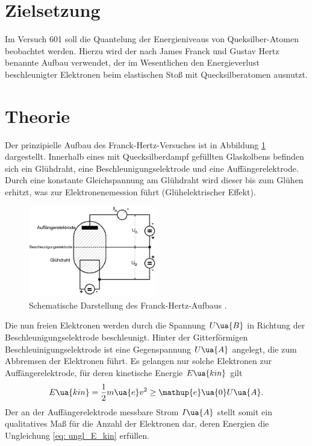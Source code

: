 \setcounter{page}{1}
\section*{Zielsetzung}
Im Versuch 601 soll die Quantelung der Energieniveaus von Queksilber-Atomen beobachtet werden.
Hierzu wird der nach James Franck und Gustav Hertz benannte Aufbau verwendet, der im Wesentlichen
den Energieverlust beschleunigter Elektronen beim elastischen Stoß mit Quecksilberatomen ausnutzt.

\section{Theorie}
Der prinzipielle Aufbau des Franck-Hertz-Versuches ist in Abbildung \ref{fig: schema_aufbau} dargestellt. Innerhalb
eines mit Quecksilberdampf gefüllten Glaskolbens befinden sich ein Glühdraht, eine Beschleunigungselektrode und
eine Auffängerelektrode. Durch eine konstante Gleichspannung am Glühdraht wird dieser bis zum Glühen
erhitzt, was zur Elektronenemession führt (Glühelektrischer Effekt).
\begin{figure}
  \centering
  \includegraphics[width = 0.5\textwidth]{pics/schema_aufbau.png}
  \caption{Schematische Darstellung des Franck-Hertz-Aufbaus \cite{anleitung601}.}
  \label{fig: schema_aufbau}
\end{figure}
Die nun freien Elektronen werden durch die Spannung $U\ua{B}$ in Richtung der Beschleunigungselektrode
beschleunigt. Hinter der Gitterförmigen Beschleuinigungselektrode ist eine Gegenspannung $U\ua{A}$ angelegt, die zum Abbremsen
der Elektronen führt. Es gelangen nur solche Elektronen zur Auffängerelektrode, für deren kinetische Energie $E\ua{kin}$
gilt
\begin{equation}
 \label{eq: ungl_E_kin}
  E\ua{kin} = \frac{1}{2}m\ua{e}v^2 \geq \mathup{e}\ua{0}U\ua{A}.
\end{equation}
Der an der Auffängerelektrode messbare Strom $I\ua{A}$ stellt somit ein qualitatives Maß für die Anzahl der
Elektronen dar, deren Energien die Ungleichung \eqref{eq: ungl_E_kin} erfüllen.\\
